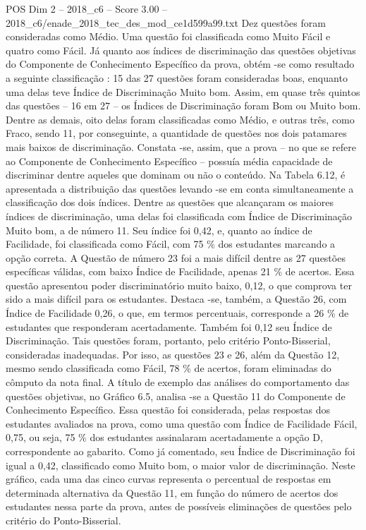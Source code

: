 \begin{textsample}{POS Dim 2 – 2018\_c6 – Score 3.00 – 2018\_c6/enade\_2018\_tec\_des\_mod\_ce1d599a99.txt}
Dez questões foram consideradas como Médio.
Uma questão foi classificada como Muito Fácil e quatro como Fácil.
Já quanto aos índices de discriminação das questões objetivas do Componente de Conhecimento Específico da prova, obtém -se como resultado a seguinte classificação : 15 das 27 questões foram consideradas boas, enquanto uma delas teve Índice de Discriminação Muito bom.
Assim, em quase três quintos das questões – 16 em 27 – os Índices de Discriminação foram Bom ou Muito bom.
Dentre as demais, oito delas foram classificadas como Médio, e outras três, como Fraco, sendo 11, por conseguinte, a quantidade de questões nos dois patamares mais baixos de discriminação.
Constata -se, assim, que a prova – no que se refere ao Componente de Conhecimento Específico – possuía média capacidade de discriminar dentre aqueles que dominam ou não o conteúdo.
Na Tabela 6.12, é apresentada a distribuição das questões levando -se em conta simultaneamente a classificação dos dois índices.
Dentre as questões que alcançaram os maiores índices de discriminação, uma delas foi classificada com Índice de Discriminação Muito bom, a de número 11.
Seu índice foi 0,42, e, quanto ao índice de Facilidade, foi classificada como Fácil, com 75 \% dos estudantes marcando a opção correta.
A Questão de número 23 foi a mais difícil dentre as 27 questões específicas válidas, com baixo Índice de Facilidade, apenas 21 \% de acertos.
Essa questão apresentou poder discriminatório muito baixo, 0,12, o que comprova ter sido a mais difícil para os estudantes.
Destaca -se, também, a Questão 26, com Índice de Facilidade 0,26, o que, em termos percentuais, corresponde a 26 \% de estudantes que responderam acertadamente.
Também foi 0,12 seu Índice de Discriminação.
Tais questões foram, portanto, pelo critério Ponto-Bisserial, consideradas inadequadas.
Por isso, as questões 23 e 26, além da Questão 12, mesmo sendo classificada como Fácil, 78 \% de acertos, foram eliminadas do cômputo da nota final.
A título de exemplo das análises do comportamento das questões objetivas, no Gráfico 6.5, analisa -se a Questão 11 do Componente de Conhecimento Específico.
Essa questão foi considerada, pelas respostas dos estudantes avaliados na prova, como uma questão com Índice de Facilidade Fácil, 0,75, ou seja, 75 \% dos estudantes assinalaram acertadamente a opção D, correspondente ao gabarito.
Como já comentado, seu Índice de Discriminação foi igual a 0,42, classificado como Muito bom, o maior valor de discriminação.
Neste gráfico, cada uma das cinco curvas representa o percentual de respostas em determinada alternativa da Questão 11, em função do número de acertos dos estudantes nessa parte da prova, antes de possíveis eliminações de questões pelo critério do Ponto-Bisserial.

\end{textsample}
